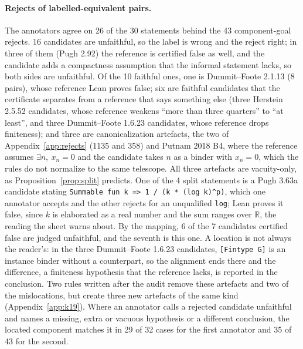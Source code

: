 \documentclass[10pt]{article}
\theoremstyle{definition}
\begin{document}
\paragraph{Rejects of labelled-equivalent pairs.} The annotators agree on 26 of the 30 statements
behind the 43 component-goal rejects. 16 candidates are unfaithful, so the label is wrong and the
reject right; in three of them (Pugh 2.92) the reference is certified false as well, and the
candidate adds a compactness assumption that the informal statement lacks, so both sides are
unfaithful. Of the 10 faithful ones, one is Dummit--Foote 2.1.13 (8 pairs), whose reference Lean
proves false; six are faithful candidates that the certificate separates from a reference that
says something else (three Herstein 2.5.52 candidates, whose reference weakens ``more than three
quarters'' to ``at least'', and three Dummit--Foote 1.6.23 candidates, whose reference drops
finiteness); and three are canonicalization artefacts, the two of Appendix~\ref{app:rejects}
(1135 and 358) and Putnam 2018 B4, where the reference assumes $\exists n,\ x_n=0$ and the
candidate takes $n$ as a binder with $x_n=0$, which the rules do not normalize to the same
telescope. All three artefacts are vacuity-only, as Proposition~\ref{prop:split} predicts. One of
the 4 split statements is a Pugh 3.63a candidate stating
\texttt{Summable fun k => 1 / (k * (log k)\^{}p)}, which one annotator accepts and the other
rejects for an unqualified \texttt{log}; Lean proves it false, since $k$ is elaborated as a real
number and the sum ranges over $\mathbb R$, the reading the sheet warns about. By the mapping, 6
of the 7 candidates certified false are judged unfaithful, and the seventh is this one. A location
is not always the reader's: in the three Dummit--Foote 1.6.23 candidates, \texttt{[Fintype G]} is
an instance binder without a counterpart, so the alignment ends there and the difference, a
finiteness hypothesis that the reference lacks, is reported in the conclusion. Two rules written
after the audit remove these artefacts and two of the mislocations, but create three new artefacts
of the same kind (Appendix~\ref{app:k19}). Where an annotator
calls a rejected candidate unfaithful and names a missing, extra or vacuous hypothesis or a
different conclusion, the located component matches it in 29 of 32 cases for the first annotator
and 35 of 43 for the second.
\end{document}
